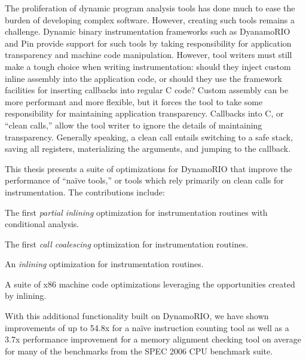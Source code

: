 \begin{abstractpage}

The proliferation of dynamic program analysis tools has done much to ease the
burden of developing complex software.  However, creating such tools remains a
challenge.  Dynamic binary instrumentation frameworks such as DyanamoRIO and
Pin provide support for such tools by taking responsibility for application
transparency and machine code manipulation.  However, tool writers must still
make a tough choice when writing instrumentation: should they inject custom
inline assembly into the application code, or should they use the framework
facilities for inserting callbacks into regular C code?  Custom assembly can be
more performant and more flexible, but it forces the tool to take some
responsibility for maintaining application transparency.  Callbacks into C, or
``clean calls,'' allow the tool writer to ignore the details of maintaining
transparency.  Generally speaking, a clean call entails switching to a safe
stack, saving all registers, materializing the arguments, and jumping to the
callback.


This thesis presents a suite of optimizations for DynamoRIO that improve the
performance of ``na\"ive tools,'' or tools which rely primarily on clean calls
for instrumentation.  The contributions include:

\begin{packed_itemize}
\item The first {\em partial inlining} optimization for instrumentation
routines with conditional analysis.
\item The first {\em call coalescing} optimization for instrumentation
routines.
\item An {\em inlining} optimization for instrumentation routines.
\item A suite of x86 machine code optimizations leveraging the opportunities
created by inlining.
\end{packed_itemize}

With this additional functionality built on DynamoRIO, we have shown
improvements of up to 54.8x for a na\"ive instruction counting tool as well as a
3.7x performance improvement for a memory alignment checking tool on average for
many of the benchmarks from the SPEC 2006 CPU benchmark suite.

\end{abstractpage}
